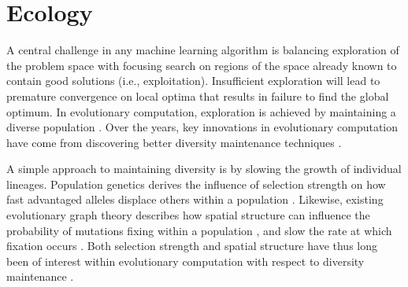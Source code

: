 

\section{Ecology}
\label{sec:diversity-maintenance}

A central challenge in any machine learning algorithm is balancing exploration of the problem space with focusing search on regions of the space already known to contain good solutions (i.e., exploitation).
Insufficient exploration will lead to premature convergence on local optima that results in failure to find the global optimum.
In evolutionary computation, exploration is achieved by maintaining a diverse population \citep{sudholt2019benefits}.
Over the years, key innovations in evolutionary computation have come from discovering better diversity maintenance techniques \citep{goldberg1987genetic, wang2019poet}.

A simple approach to maintaining diversity is by slowing the growth of individual lineages.
Population genetics derives the influence of selection strength on how fast advantaged alleles displace others within a population \citep{kimura1980average}.
Likewise, existing evolutionary graph theory describes how spatial structure can influence the probability of mutations fixing within a population \citep{lieberman2005evolutionary}, and slow the rate at which fixation occurs \citep{frean2013effect}.
Both selection strength and spatial structure have thus long been of interest within evolutionary computation with respect to diversity maintenance \citep{simon2008biogeographybased,blickle1995comparison}.

